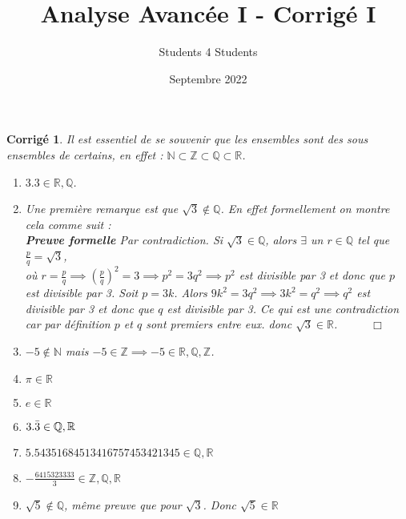 \documentclass[11pt,french,table]{article}
\title{Analyse Avancée I - Corrigé I}
\author{Students 4 Students}
\date{Septembre 2022}
\theoremstyle{exercice}
\theoremstyle{corrigé}
\newtheorem{corrigé}{Corrigé}
\begin{document}
\maketitle
\vspace{1em}
\begin{corrigé}
 Il est essentiel de se souvenir que les ensembles sont des sous ensembles de certains, en effet : $\mathbb{N}\subset \mathbb{Z}\subset\mathbb{Q}\subset\mathbb{R}$.
    
    \begin{enumerate}
    \item[(a)] $3.3\in \mathbb{R}, \mathbb{Q}$. 
        \item[(b)] Une première remarque est que $\sqrt{3}\notin \mathbb{Q}$. En effet formellement on montre cela comme suit : \\
       \textbf{Preuve formelle}
        Par contradiction. Si $\sqrt{3}\in \mathbb{Q}$, alors $\exists$ un $r\in \mathbb{Q}$ tel que $\frac{p}{q}=\sqrt{3}$,\\ où $r=\frac{p}{q}\implies(\frac{p}{q})^2=3\implies p^2=3q^2\implies p^2$ est divisible par 3 et donc que $p$ est divisible par 3. Soit $p=3k$. Alors $9k^2=3q^2\implies 3k^2=q^2\implies q^2$ est divisible par 3 et donc que $q$ est divisible par 3. Ce qui est une contradiction car par définition $p$ et $q$ sont premiers entre eux. 
        donc $\sqrt{3}\in \mathbb{R}$. \ \ \ \ \ $\Box$
        \item[(c)] $-5 \notin \mathbb{N}$ mais $-5\in \mathbb{Z}\implies -5\in \mathbb{R},\mathbb{Q}, \mathbb{Z}$.
        \item[(d)] $\pi\in \mathbb{R}$
      

     \item[(e)] $e\in \mathbb{R}$
        \item[(f)] $3.\Bar{3}\in \mathbb{Q},\mathbb{R}$
        \item[(g)] $5.54351684513416757453421345 \in \mathbb{Q},\mathbb{R}$
        \item[(h)] $-\frac{6415323333}{3} \in \mathbb{Z},\mathbb{Q},\mathbb{R}$
        \item[(i)] $\sqrt{5}\notin\mathbb{Q}$, même preuve que pour $\sqrt{3}$. Donc $\sqrt{5}\in \mathbb{R}$
      \end{enumerate}
\end{corrigé}
\vspace{1em}
\end{document}
